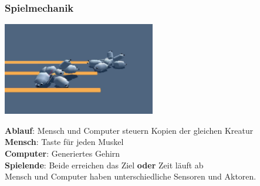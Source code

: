 \documentclass{beamer}
\begin{document}
\begin{frame}
	\frametitle{Spielmechanik}
	
	\includegraphics[width=0.5\textwidth]{img/games/darwin.png}
	\vspace{1em}
	
	\textbf{Ablauf}: Mensch und Computer steuern Kopien der gleichen Kreatur \\
	\vspace{1em}
	\textbf{Mensch}: Taste für jeden Muskel \\
	\textbf{Computer}: Generiertes Gehirn \\
	\vspace{1em}
	\textbf{Spielende}: Beide erreichen das Ziel \textbf{oder} Zeit läuft ab \\
	\vspace{1em}
	Mensch und Computer haben unterschiedliche Sensoren und Aktoren.
\end{frame}
\end{document}
